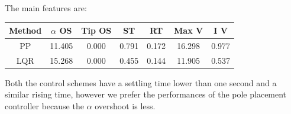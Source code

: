 The main features are:


\begin{table}[h!]
    \centering
    \hspace*{-3em}
    \begin{tabular}{||c c c c c c c||} 
    \hline
    Method & $\alpha$ OS & Tip OS & ST & RT & Max V & I V\\ 
    \hline\hline
    PP &  11.405 & 0.000 & 0.791 & 0.172 & 16.298 & 0.977 \\ 
    \hline
    LQR & 15.268 & 0.000 & 0.455 & 0.144 & 11.905 & 0.537 \\ 
    \hline
    \end{tabular}
\end{table}

Both the control schemes have a settling time lower than one second and a similar rising time, however we prefer the performances of the pole placement controller because the $\alpha$ overshoot is less.